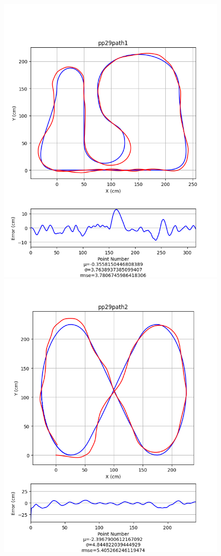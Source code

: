 \documentclass[mla7]{mla}
\begin{document}
\begin{paper}
\begin{figure}[H]
\includegraphics[width=\linewidth]{pathData/pppath1}
\endminipage\hfill
{}
\includegraphics[width=\linewidth]{pathData/pppath2}

\end{figure}
\end{paper}
\end{document}
